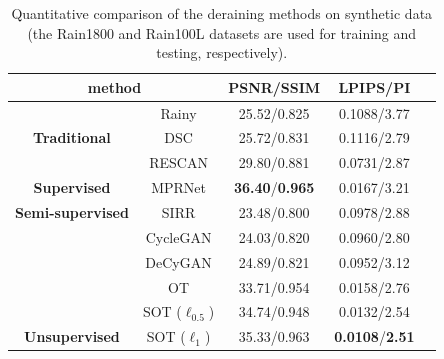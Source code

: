 \documentclass[10pt,journal,compsoc]{IEEEtran}
\begin{document}
\begin{table}[!t]
	\renewcommand\arraystretch{2}
	\footnotesize
	\centering
	\caption{Quantitative comparison of the deraining methods on synthetic data 
 (the Rain1800 and Rain100L datasets are used for training and testing, respectively).}
        \begin{tabular}{|cc|c|c|c|}
		\hline
		\multicolumn{2}{|c|}{\textbf{method}}                                                       & \textbf{PSNR/SSIM}   & \textbf{LPIPS/PI}     \\ \hline
		\multicolumn{1}{|c|}{\textbf{}}                        & Rainy                           & 25.52/0.825                        & 0.1088/3.77                       \\ \hline
		\multicolumn{1}{|c|}{\textbf{Traditional}}                    & DSC\cite{dsc}                            & 25.72/0.831                       & 0.1116/2.79                       \\ \hline
		\multicolumn{1}{|c|}{}                                 & RESCAN\cite{rescan}                         & 29.80/0.881                        & 0.0731/2.87                        \\ \cline{2-4} 
		\multicolumn{1}{|c|}{\multirow{-2}{*}{\textbf{Supervised}}}  & MPRNet\cite{multi}                         & \textbf{36.40}/\textbf{0.965}                        & 0.0167/3.21                      \\ \hline
		\multicolumn{1}{|c|}{\textbf{Semi-supervised}}                   & SIRR\cite{wei2019semi}                           & 23.48/0.800                        & 0.0978/2.88                        \\ \hline
		\multicolumn{1}{|c|}{}                                 & CycleGAN\cite{cyclegan}                       & 24.03/0.820                        & 0.0960/2.80                       \\ \cline{2-4} 
		\multicolumn{1}{|c|}{}                                 & DeCyGAN\cite{deraincyclegan}                 & 24.89/0.821                        & 0.0952/3.12                        \\ \cline{2-4} 
		\multicolumn{1}{|c|}{}                                 & OT\cite{wang2022optimal}                             & 33.71/0.954                        & 0.0158/2.76                        \\ \cline{2-4} 
		\multicolumn{1}{|c|}{}                                 & SOT ($\ell_{0.5}$)                           & 34.74/0.948                        & 0.0132/2.54                       \\ \cline{2-4} 
		\multicolumn{1}{|c|}{\multirow{-5}{*}{\textbf{Unsupervised}}}  &SOT ($\ell_{1}$) &  35.33/0.963 & \textbf{0.0108}/\textbf{2.51} \\ \hline
	\end{tabular}
\end{table}
\end{document}
